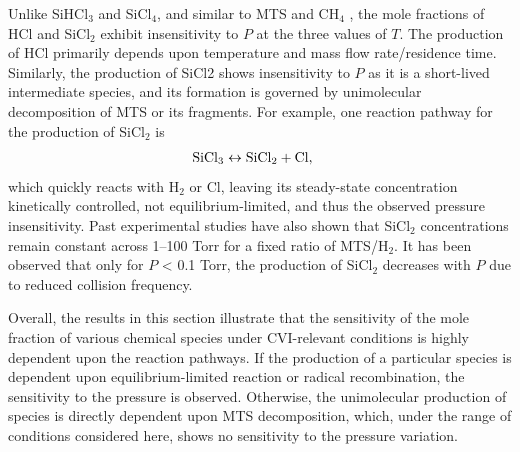 \documentclass[final, letterpaper, square, comma, numbers, sort&compress]{elsarticle}
\begin{document}
Unlike SiHCl$_3$ and SiCl$_4$, and similar to MTS and CH$_4$ , the mole fractions of HCl and SiCl$_2$ exhibit insensitivity to $P$ at the three values of $T$. The production of HCl primarily depends upon temperature and mass flow rate/residence time. Similarly, the production of SiCl2 shows insensitivity to $P$ as it is a short-lived intermediate species, and its formation is governed by unimolecular decomposition of MTS or its fragments. For example, one reaction pathway for the production of SiCl$_2$ is
\begin{align*}
    \rm SiCl_3 \leftrightarrow SiCl_2 + Cl, &
\end{align*}
which quickly reacts with H$_2$ or Cl, leaving its steady-state concentration kinetically controlled, not equilibrium-limited, and thus the observed pressure insensitivity. Past experimental studies have also shown that SiCl$_2$ concentrations remain constant across 1–100 Torr for a fixed ratio of MTS/H$_2$. It has been observed that only for $P$ < 0.1 Torr, the production of SiCl$_2$ decreases with $P$ due to reduced collision frequency.

Overall, the results in this section illustrate that the sensitivity of the mole fraction of various chemical species under CVI-relevant conditions is highly dependent upon the reaction pathways. If the production of a particular species is dependent upon equilibrium-limited reaction or radical recombination, the sensitivity to the pressure is observed. Otherwise, the unimolecular production of species is directly dependent upon MTS decomposition, which, under the range of conditions considered here, shows no sensitivity to the pressure
variation.
\end{document}

